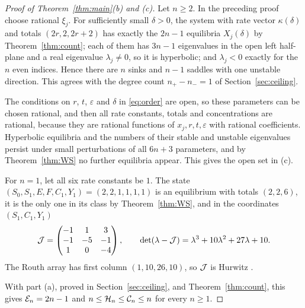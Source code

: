 \begin{proof}[Proof of Theorem~\ref{thm:main}\textup{(b)} and \textup{(c)}]
Let \(n\ge2\). In the preceding proof choose rational \(\xi_j\). For sufficiently small
\(\delta>0\), the system with rate vector \(\kappa(\delta)\) and totals \((2r,2,2r+2)\) has
exactly the \(2n-1\) equilibria \(X_j(\delta)\) by Theorem~\ref{thm:count}; each of them has
\(3n-1\) eigenvalues in the open left half-plane and a real eigenvalue \(\lambda_j\ne0\), so it
is hyperbolic; and \(\lambda_j<0\) exactly for the \(n\) even indices. Hence there are \(n\)
sinks and \(n-1\) saddles with one unstable direction. This agrees with the degree count
\(n_+-n_-=1\) of Section~\ref{sec:ceiling}.

The conditions on \(r\), \(t\), \(\varepsilon\) and \(\delta\) in \eqref{eq:order} are open, so
these parameters can be chosen rational, and then all rate constants, totals and concentrations
are rational, because they are rational functions of \(x_j,r,t,\varepsilon\) with rational
coefficients. Hyperbolic equilibria and the numbers of their stable and unstable eigenvalues
persist under small perturbations of all \(6n+3\) parameters, and by Theorem~\ref{thm:WS} no
further equilibria appear. This gives the open set in (c).

For \(n=1\), let all six rate constants be \(1\). The state
\((S_0,S_1,E,F,C_1,Y_1)=(2,2,1,1,1,1)\) is an equilibrium with totals \((2,2,6)\), it is the
only one in its class by Theorem~\ref{thm:WS}, and in the coordinates \((S_1,C_1,Y_1)\)
\[
 \mathcal J=\begin{pmatrix}-1&1&3\\-1&-5&-1\\1&0&-4\end{pmatrix},\qquad
 \det(\lambda-\mathcal J)=\lambda^3+10\lambda^2+27\lambda+10 .
\]
The Routh array has first column \((1,10,26,10)\), so \(\mathcal J\) is Hurwitz \cite[Ch.~XV]{Gantmacher}.

With part (a), proved in Section~\ref{sec:ceiling}, and Theorem~\ref{thm:count}, this gives
\(\mathcal E_n=2n-1\) and \(n\le\mathcal H_n\le\mathcal C_n\le n\) for every \(n\ge1\).
\end{proof}
